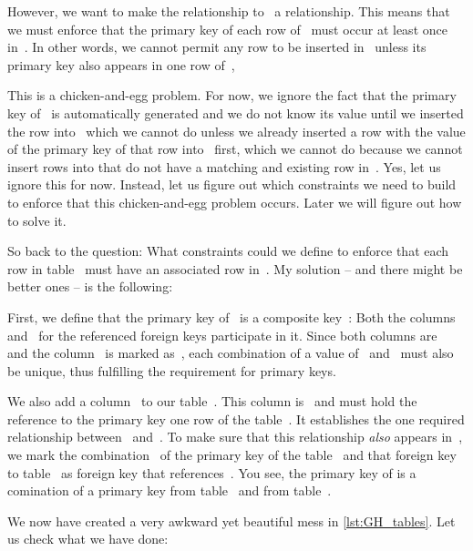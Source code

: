 However, we want to make the relationship to~ a  relationship.
This means that we must enforce that the primary key of each row of~ must occur at least once in~.
In other words, we cannot permit any row to be inserted in~ unless its primary key also appears in one row of~,

This is a chicken-and-egg problem.
For now, we ignore the fact that the primary key of~ is automatically generated and we do not know its value until we inserted the row into~ which we cannot do unless we already inserted a row with the value of the primary key of that row into~ first, which we cannot do because we cannot insert rows into  that do not have a matching and existing row in~.
Yes, let us ignore this for now.
Instead, let us figure out which constraints we need to build to enforce that this chicken-and-egg problem occurs.
Later we will figure out how to solve it.

So back to the question:
What constraints could we define to enforce that each row in table~ must have an associated row in~.
My solution -- and there might be better ones -- is the following:

First, we define that the primary key of~ is a composite key~:
Both the columns~ and~ for the referenced foreign keys participate in it.
Since both columns are~ and the column~ is marked as~, each combination of a value of~ and~ must also be unique, thus fulfilling the requirement for primary keys.

We also add a column~ to our table~.
This column is~ and must hold the reference to the primary key one row of the table~.
It establishes the one required relationship between~ and~.
To make sure that this relationship \emph{also} appears in~, we mark the combination~ of the primary key of the table~ and that foreign key to table~ as foreign key that references~.
You see, the primary key of  is a comination of a primary key from table~ and from table~.

We now have created a very awkward yet beautiful mess in \cref{lst:GH_tables}.
Let us check what we have done:

